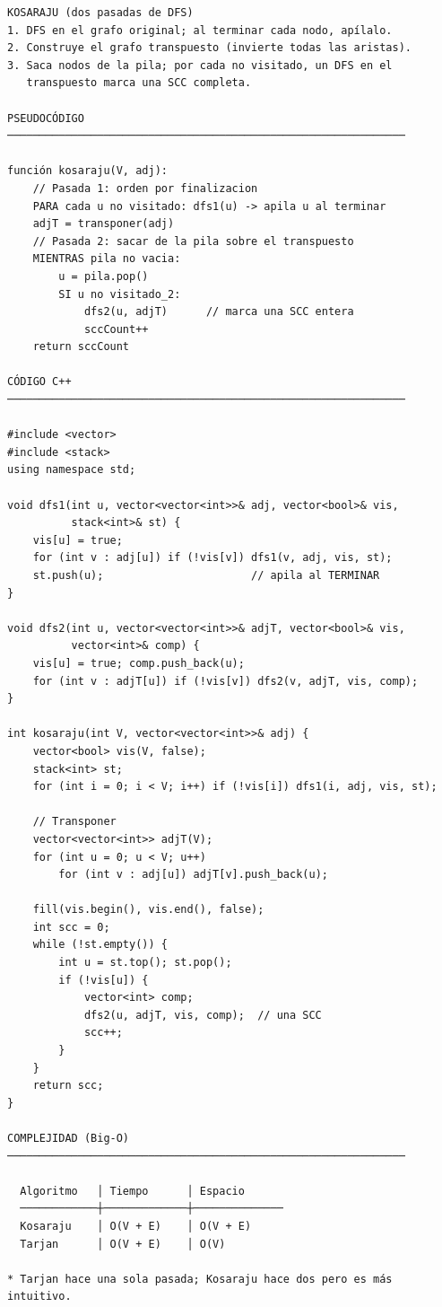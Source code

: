 \begin{lstlisting}
KOSARAJU (dos pasadas de DFS)
1. DFS en el grafo original; al terminar cada nodo, apílalo.
2. Construye el grafo transpuesto (invierte todas las aristas).
3. Saca nodos de la pila; por cada no visitado, un DFS en el
   transpuesto marca una SCC completa.

PSEUDOCÓDIGO
──────────────────────────────────────────────────────────────

función kosaraju(V, adj):
    // Pasada 1: orden por finalizacion
    PARA cada u no visitado: dfs1(u) -> apila u al terminar
    adjT = transponer(adj)
    // Pasada 2: sacar de la pila sobre el transpuesto
    MIENTRAS pila no vacia:
        u = pila.pop()
        SI u no visitado_2:
            dfs2(u, adjT)      // marca una SCC entera
            sccCount++
    return sccCount

CÓDIGO C++
──────────────────────────────────────────────────────────────

#include <vector>
#include <stack>
using namespace std;

void dfs1(int u, vector<vector<int>>& adj, vector<bool>& vis,
          stack<int>& st) {
    vis[u] = true;
    for (int v : adj[u]) if (!vis[v]) dfs1(v, adj, vis, st);
    st.push(u);                       // apila al TERMINAR
}

void dfs2(int u, vector<vector<int>>& adjT, vector<bool>& vis,
          vector<int>& comp) {
    vis[u] = true; comp.push_back(u);
    for (int v : adjT[u]) if (!vis[v]) dfs2(v, adjT, vis, comp);
}

int kosaraju(int V, vector<vector<int>>& adj) {
    vector<bool> vis(V, false);
    stack<int> st;
    for (int i = 0; i < V; i++) if (!vis[i]) dfs1(i, adj, vis, st);

    // Transponer
    vector<vector<int>> adjT(V);
    for (int u = 0; u < V; u++)
        for (int v : adj[u]) adjT[v].push_back(u);

    fill(vis.begin(), vis.end(), false);
    int scc = 0;
    while (!st.empty()) {
        int u = st.top(); st.pop();
        if (!vis[u]) {
            vector<int> comp;
            dfs2(u, adjT, vis, comp);  // una SCC
            scc++;
        }
    }
    return scc;
}

COMPLEJIDAD (Big-O)
──────────────────────────────────────────────────────────────

  Algoritmo   │ Tiempo      │ Espacio
  ────────────┼─────────────┼──────────────
  Kosaraju    │ O(V + E)    │ O(V + E)
  Tarjan      │ O(V + E)    │ O(V)

* Tarjan hace una sola pasada; Kosaraju hace dos pero es más intuitivo.
\end{lstlisting}

